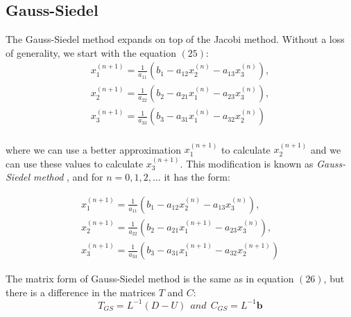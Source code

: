 \documentclass[letterpaper,12pt]{article}
\begin{document}
\subsection{Gauss-Siedel}
The Gauss-Siedel method expands on top of the Jacobi method. Without a loss of generality, we start with the equation $(25)$:
\begin{equation}\nonumber
    \begin{array}{cc}
        x_1^{(n+1)} = \frac{1}{a_{11}}(b_1 - a_{12}x_2^{(n)} - a_{13}x_3^{(n)}),\\
        x_2^{(n+1)} = \frac{1}{a_{22}}(b_2 - a_{21}x_1^{(n)} - a_{23}x_3^{(n)}),\\
        x_3^{(n+1)} = \frac{1}{a_{33}}(b_3 - a_{31}x_1^{(n)} - a_{32}x_2^{(n)})\\
    \end{array}
\end{equation}

where we can use a better approximation $x_1^{(n+1)}$ to calculate $x_2^{(n+1)}$ and we can use these values to calculate $x_3^{(n+1)}$. This modification is known as \textit{Gauss-Siedel method} \cite{siedel}, and for $n = 0, 1, 2, \dots$ it has the form:

\begin{equation}
    \begin{array}{l}
    x_1^{(n+1)} = \frac{1}{a_{11}}(b_1 - a_{12}x_2^{(n)} - a_{13}x_3^{(n)}),\\
    x_2^{(n+1)} = \frac{1}{a_{22}}(b_2 - a_{21}x_1^{(n+1)} - a_{23}x_3^{(n)}),\\
    x_3^{(n+1)} = \frac{1}{a_{33}}(b_3 - a_{31}x_1^{(n+1)} - a_{32}x_2^{(n+1)})
    \end{array}
\end{equation}

The matrix form of Gauss-Siedel method is the same as in equation $(26)$, but there is a difference in the matrices $T$ and $C$:
\begin{equation}
    T_{GS} = L^{-1}(D-U)\  \ and \  \  C_{GS} = L^{-1}\textbf{b}
\end{equation}
\end{document}
